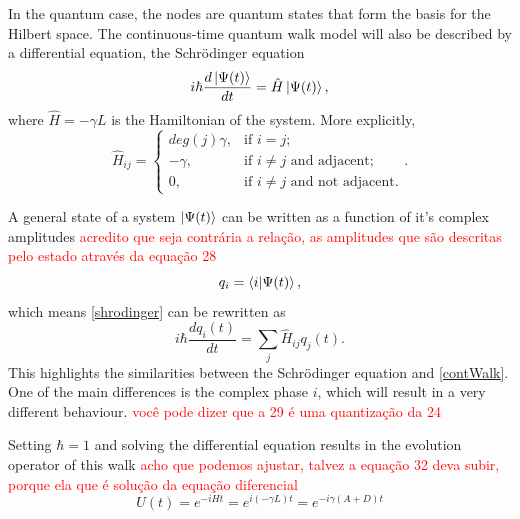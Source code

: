                 In the quantum case, the nodes are quantum states that form the basis for the Hilbert space. The continuous-time quantum walk model will also be described by a differential equation, the Schrödinger equation
                \begin{equation}
                    i\hbar \frac{d\ket{\Psi(t)}}{dt} = \hat{H} \ket{\Psi(t)}, \label{shrodinger}
                \end{equation}
                where $\hat{H} = -\gamma L$ is the Hamiltonian of the system. More explicitly,
                \begin{equation}
                    \hat{H}_{ij} = \begin{cases} 
                            deg(j)\gamma, & \mbox{if } i= j; \\ 
                            -\gamma, & \mbox{if } i\neq j\mbox{ and adjacent};\\
                            0, & \mbox{if } i\neq j\mbox{ and not adjacent}.
                        \end{cases}.
                        \label{Hamilt}
                \end{equation}\par
                A general state of a system $\ket{\Psi(t)}$ can be written as a function of it's complex amplitudes \textcolor{red}{acredito que seja contrária a relação, as amplitudes que são descritas pelo estado através da equação 28}
                \begin{equation}
                    q_i = \braket{i|\Psi(t)},
                \end{equation}
                which means \ref{shrodinger} can be rewritten as 
                \begin{equation}
                     i\hbar \frac{dq_i(t)}{dt} = \sum_j \hat{H}_{ij} q_j(t).
                \end{equation}
                This highlights the similarities between the Schrödinger equation and \ref{contWalk}. One of the main differences is the complex phase $i$, which will result in a very different behaviour. \textcolor{red}{você pode dizer que a 29 é uma quantização da 24}\par
                Setting $\hbar = 1$ and solving the differential equation results in the evolution operator of this walk \textcolor{red}{acho que podemos ajustar, talvez a equação 32 deva subir, porque ela que é solução da equação diferencial}%
            	\begin{equation}
            	    U(t) = e^{-iHt} = e^{i(-\gamma L)t} = e^{-i\gamma(A+D)t}
            	\end{equation}
